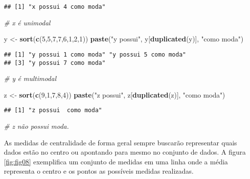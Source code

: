 \documentclass[12pt,]{style/krantz}
\makeatletter
\newenvironment{Shaded}{\begin{snugshade}}{\end{snugshade}}
\newcommand{\CommentTok}[1]{\textcolor[rgb]{0.56,0.35,0.01}{\textit{#1}}}
\newcommand{\DecValTok}[1]{\textcolor[rgb]{0.00,0.00,0.81}{#1}}
\newcommand{\KeywordTok}[1]{\textcolor[rgb]{0.13,0.29,0.53}{\textbf{#1}}}
\newcommand{\NormalTok}[1]{#1}
\newcommand{\StringTok}[1]{\textcolor[rgb]{0.31,0.60,0.02}{#1}}
\newenvironment{kframe}{%
\medskip{}
\setlength{\fboxsep}{.8em}
 \def\at@end@of@kframe{}%
 \ifinner\ifhmode%
  \def\at@end@of@kframe{\end{minipage}}%
  \begin{minipage}{\columnwidth}%
 \fi\fi%
 \def\FrameCommand##1{\hskip\@totalleftmargin \hskip-\fboxsep
 \colorbox{shadecolor}{##1}\hskip-\fboxsep
     \hskip-\linewidth \hskip-\@totalleftmargin \hskip\columnwidth}%
 \MakeFramed {\advance\hsize-\width
   \@totalleftmargin\z@ \linewidth\hsize
   \@setminipage}}%
 {\par\unskip\endMakeFramed%
 \at@end@of@kframe}
\renewenvironment{Shaded}{\begin{kframe}}{\end{kframe}}
\theoremstyle{definition}
\theoremstyle{definition}
\theoremstyle{definition}
\theoremstyle{remark}
\makeatother
\begin{document}
\begin{verbatim}
## [1] "x possui 4 como moda"
\end{verbatim}

\begin{Shaded}
\begin{Highlighting}[]
\CommentTok{# x é unimodal}

\NormalTok{y <-}\StringTok{ }\KeywordTok{sort}\NormalTok{(}\KeywordTok{c}\NormalTok{(}\DecValTok{5}\NormalTok{,}\DecValTok{5}\NormalTok{,}\DecValTok{7}\NormalTok{,}\DecValTok{7}\NormalTok{,}\DecValTok{6}\NormalTok{,}\DecValTok{1}\NormalTok{,}\DecValTok{2}\NormalTok{,}\DecValTok{1}\NormalTok{))}
\KeywordTok{paste}\NormalTok{(}\StringTok{"y possui"}\NormalTok{, y[}\KeywordTok{duplicated}\NormalTok{(y)], }\StringTok{"como moda"}\NormalTok{)}
\end{Highlighting}
\end{Shaded}

\begin{verbatim}
## [1] "y possui 1 como moda" "y possui 5 como moda"
## [3] "y possui 7 como moda"
\end{verbatim}

\begin{Shaded}
\begin{Highlighting}[]
\CommentTok{# y é multimodal}

\NormalTok{z <-}\StringTok{ }\KeywordTok{sort}\NormalTok{(}\KeywordTok{c}\NormalTok{(}\DecValTok{9}\NormalTok{,}\DecValTok{1}\NormalTok{,}\DecValTok{7}\NormalTok{,}\DecValTok{8}\NormalTok{,}\DecValTok{4}\NormalTok{))}
\KeywordTok{paste}\NormalTok{(}\StringTok{"z possui"}\NormalTok{, z[}\KeywordTok{duplicated}\NormalTok{(z)], }\StringTok{"como moda"}\NormalTok{)}
\end{Highlighting}
\end{Shaded}

\begin{verbatim}
## [1] "z possui  como moda"
\end{verbatim}

\begin{Shaded}
\begin{Highlighting}[]
\CommentTok{# z não possui moda.}
\end{Highlighting}
\end{Shaded}

As medidas de centralidade de forma geral sempre buscarão representar quais dados estão no centro ou apontando para mesmo no conjunto de dados.
A figura \ref{fig:fig08} exemplifica um conjunto de medidas em uma linha onde a média representa o centro e os pontos as possíveis medidas realizadas.
\end{document}
